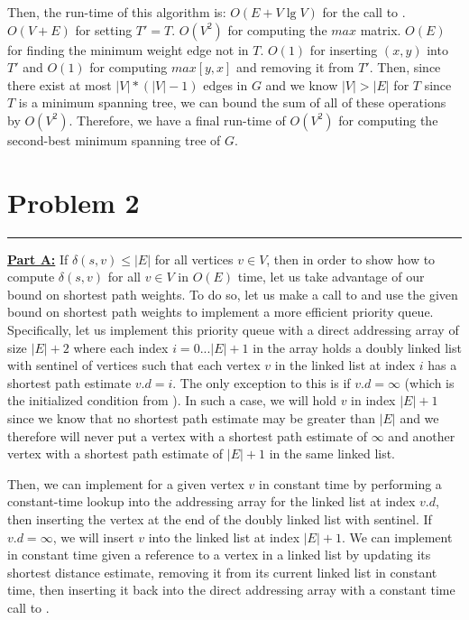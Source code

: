 \documentclass[11pt]{article}
\def\separateline{\medskip\hrule\medskip}
\begin{document}
Then, the run-time of this algorithm is: $O(E + V\lg{V})$ for the call to . $O(V+E)$ for setting $T' = T$. $O(V^2)$ for computing the $max$ matrix. $O(E)$ for finding the minimum weight edge not in $T$. $O(1)$ for inserting $(x,y)$ into $T'$ and $O(1)$ for computing $max[y,x]$ and removing it from $T'$. Then, since there exist at most $|V|*(|V|-1)$ edges in $G$ and we know $|V| > |E|$ for $T$ since $T$ is a minimum spanning tree, we can bound the sum of all of these operations by $O(V^2)$. Therefore, we have a final run-time of $O(V^2)$ for computing the second-best minimum spanning tree of $G$.

\newpage

\section{Problem 2}
\separateline

\underline{\textbf{Part A:}} If $\delta(s,v) \leq |E|$ for all vertices $v \in V$, then in order to show how to compute $\delta(s,v)$ for all $v \in V$ in $O(E)$ time, let us take advantage of our bound on shortest path weights. To do so, let us make a call to  and use the given bound on shortest path weights to implement a more efficient priority queue. Specifically, let us implement this priority queue with a direct addressing array of size $|E| + 2$ where each index $i=0...|E| + 1$ in the array holds a doubly linked list with sentinel of vertices such that each vertex $v$ in the linked list at index $i$ has a shortest path estimate $v.d = i$. The only exception to this is if $v.d = \infty$ (which is the initialized condition from ). In such a case, we will hold $v$ in index $|E| + 1$ since we know that no shortest path estimate may be greater than $|E|$ and we therefore will never put a vertex with a shortest path estimate of $\infty$ and another vertex with a shortest path estimate of $|E| + 1$ in the same linked list.

Then, we can implement  for a given vertex $v$ in constant time by performing a constant-time lookup into the addressing array for the linked list at index $v.d$, then inserting the vertex at the end of the doubly linked list with sentinel. If $v.d = \infty$, we will insert $v$ into the linked list at index $|E| + 1$. We can implement  in constant time given a reference to a vertex in a linked list by updating its shortest distance estimate, removing it from its current linked list in constant time, then inserting it back into the direct addressing array with a constant time call to .
\end{document}
